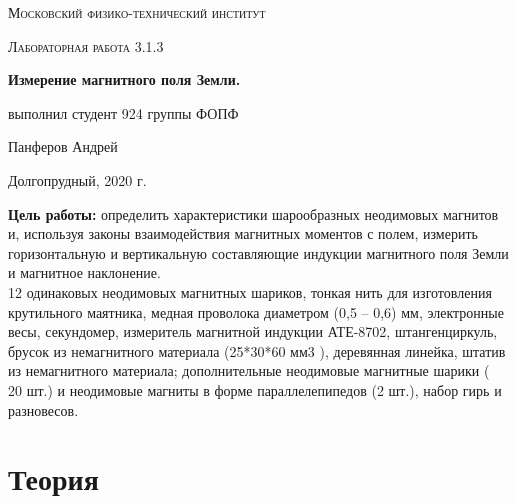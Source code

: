 \documentclass[a4paper,12pt]{article}
\begin{document}
\begin{titlepage}
	\centering
	\vspace{5cm}
	{\scshape\LARGE Московский физико-технический институт \par}
	\vspace{4cm}
	{\scshape\Large Лабораторная работа 3.1.3 \par}
	\vspace{1cm}
	{\huge\bfseries Измерение магнитного поля Земли. \par}
	\vspace{1cm}
	\vfill
\begin{flushright}
	{\large выполнил студент 924 группы ФОПФ}\par
	\vspace{0.3cm}
	{\LARGE Панферов Андрей}
\end{flushright}
	

	\vfill

	Долгопрудный, 2020 г.
\end{titlepage}

\textbf{Цель работы:} определить характеристики шарообразных неодимовых магнитов и, используя
законы взаимодействия магнитных моментов с полем, измерить горизонтальную и вертикальную
составляющие индукции магнитного поля Земли и магнитное наклонение.\\
12 одинаковых неодимовых магнитных шариков, тонкая нить для
изготовления крутильного маятника, медная проволока диаметром (0,5 – 0,6) мм, электронные весы,
секундомер, измеритель магнитной индукции АТЕ-8702, штангенциркуль, брусок из немагнитного
материала (25*30*60 мм3
), деревянная линейка, штатив из немагнитного материала;
дополнительные неодимовые магнитные шарики (~ 20 шт.) и неодимовые магниты в форме параллелепипедов (2 шт.), набор гирь и разновесов.
\section*{Теория}
\end{document}
